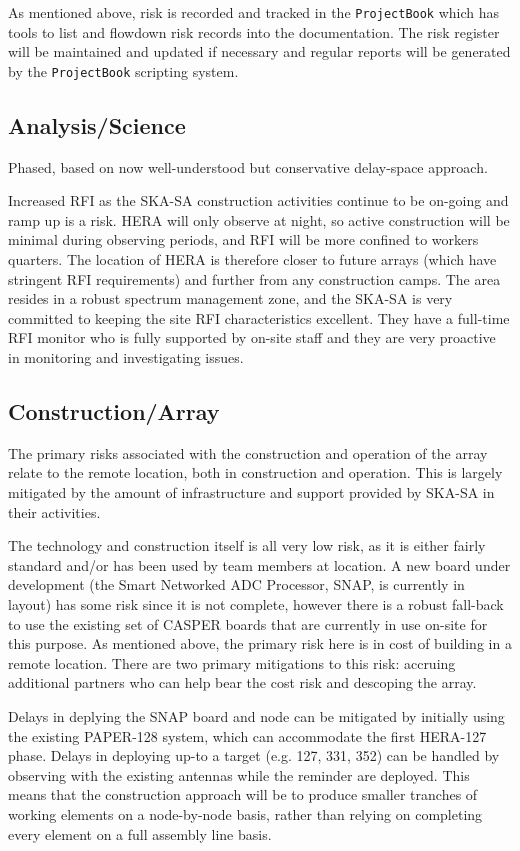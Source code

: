 \documentclass[preprint]{aastex}
\begin{document}
As mentioned above, risk is recorded and tracked in the {\tt ProjectBook} which has tools 
to list and flowdown risk records into the documentation.  The risk register will be 
maintained and updated if necessary and regular reports will be generated by the
{\tt ProjectBook} scripting system.

\subsection{Analysis/Science}
Phased, based on now well-understood but conservative delay-space approach.

Increased RFI as the SKA-SA construction activities continue to be on-going and 
ramp up is a risk.  HERA will only observe at night, so active construction will be
minimal during observing periods, and RFI will be more confined to workers quarters.
The location of HERA is therefore closer to future arrays (which have stringent
RFI requirements) and further from any construction camps.  The area resides in
a robust spectrum management zone, and the SKA-SA is very committed to
keeping the site RFI characteristics excellent.  They have a full-time RFI monitor
who is fully supported by on-site staff and they are very proactive in monitoring
and investigating issues.

\subsection{Construction/Array}
The primary risks associated with the construction and operation of the array relate
to the remote location, both in construction and operation. This is largely mitigated
by the amount of infrastructure and support provided by SKA-SA in their activities.

The technology and construction itself is all very low risk, as it is either fairly standard and/or
has been used by team members at location.  A new board under development (the Smart Networked
ADC Processor, SNAP, is currently in layout) has some risk since it is not complete, however there
is a robust fall-back to use the existing set of CASPER boards that are currently in use on-site for this
purpose.  As mentioned above, the primary risk here is in cost of building in a remote location.
There are two primary mitigations to this risk:  accruing additional partners who can help bear
the cost risk and descoping the array.

Delays in deplying the SNAP board and node can be 
mitigated by initially using the existing PAPER-128 system, which can accommodate the first 
HERA-127 phase.  Delays in deploying up-to a target (e.g. 127, 331, 352) can be handled by
observing with the existing antennas while the reminder are deployed.  This means that the
construction approach will be to produce smaller tranches of working elements on a node-by-node
basis, rather than relying on completing every element on a full assembly line basis.
\end{document}
